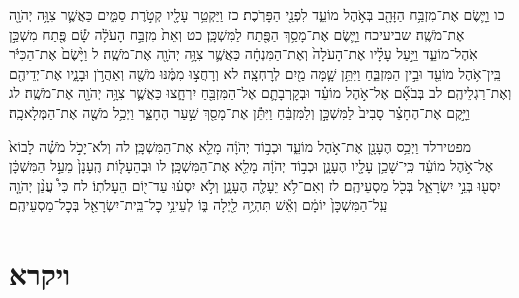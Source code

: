 \documentclass[twoside, openany, parskip=half, 11pt]{book}
\begin{document}
כו וַיָּ֛שֶׂם אֶת־מִזְבַּ֥ח הַזָּהָ֖ב בְּאֹ֣הֶל מוֹעֵ֑ד לִפְנֵ֖י הַפָּרֹֽכֶת׃ כז וַיַּקְטֵ֥ר עָלָ֖יו קְטֹ֣רֶת סַמִּ֑ים כַּאֲשֶׁ֛ר צִוָּ֥ה יְהֹוָ֖ה אֶת־מֹשֶֽׁה׃
שביעיכח וַיָּ֛שֶׂם אֶת־מָסַ֥ךְ הַפֶּ֖תַח לַמִּשְׁכָּֽן׃ כט וְאֵת֙ מִזְבַּ֣ח הָעֹלָ֔ה שָׂ֕ם פֶּ֖תַח מִשְׁכַּ֣ן אֹֽהֶל־מוֹעֵ֑ד וַיַּ֣עַל עָלָ֗יו אֶת־הָעֹלָה֙ וְאֶת־הַמִּנְחָ֔ה כַּאֲשֶׁ֛ר צִוָּ֥ה יְהֹוָ֖ה אֶת־מֹשֶֽׁה׃
ל וַיָּ֙שֶׂם֙ אֶת־הַכִּיֹּ֔ר בֵּֽין־אֹ֥הֶל מוֹעֵ֖ד וּבֵ֣ין הַמִּזְבֵּ֑חַ וַיִּתֵּ֥ן שָׁ֛מָּה מַ֖יִם לְרׇחְצָֽה׃ לא וְרָחֲצ֣וּ מִמֶּ֔נּוּ מֹשֶׁ֖ה וְאַהֲרֹ֣ן וּבָנָ֑יו אֶת־יְדֵיהֶ֖ם וְאֶת־רַגְלֵיהֶֽם׃ לב בְּבֹאָ֞ם אֶל־אֹ֣הֶל מוֹעֵ֗ד וּבְקׇרְבָתָ֛ם אֶל־הַמִּזְבֵּ֖חַ יִרְחָ֑צוּ כַּאֲשֶׁ֛ר צִוָּ֥ה יְהֹוָ֖ה אֶת־מֹשֶֽׁה׃
לג וַיָּ֣קֶם אֶת־הֶחָצֵ֗ר סָבִיב֙ לַמִּשְׁכָּ֣ן וְלַמִּזְבֵּ֔חַ וַיִּתֵּ֕ן אֶת־מָסַ֖ךְ שַׁ֣עַר הֶחָצֵ֑ר וַיְכַ֥ל מֹשֶׁ֖ה אֶת־הַמְּלָאכָֽה׃

מפטירלד וַיְכַ֥ס הֶעָנָ֖ן אֶת־אֹ֣הֶל מוֹעֵ֑ד וּכְב֣וֹד יְהֹוָ֔ה מָלֵ֖א אֶת־הַמִּשְׁכָּֽן׃ לה וְלֹא־יָכֹ֣ל מֹשֶׁ֗ה לָבוֹא֙ אֶל־אֹ֣הֶל מוֹעֵ֔ד כִּֽי־שָׁכַ֥ן עָלָ֖יו הֶעָנָ֑ן וּכְב֣וֹד יְהֹוָ֔ה מָלֵ֖א אֶת־הַמִּשְׁכָּֽן׃ לו וּבְהֵעָל֤וֹת הֶֽעָנָן֙ מֵעַ֣ל הַמִּשְׁכָּ֔ן יִסְע֖וּ בְּנֵ֣י יִשְׂרָאֵ֑ל בְּכֹ֖ל מַסְעֵיהֶֽם׃ לז וְאִם־לֹ֥א יֵעָלֶ֖ה הֶעָנָ֑ן וְלֹ֣א יִסְע֔וּ עַד־י֖וֹם הֵעָלֹתֽוֹ׃ לח כִּי֩ עֲנַ֨ן יְהֹוָ֤ה עַֽל־הַמִּשְׁכָּן֙ יוֹמָ֔ם וְאֵ֕שׁ תִּהְיֶ֥ה לַ֖יְלָה בּ֑וֹ לְעֵינֵ֥י כׇל־בֵּֽית־יִשְׂרָאֵ֖ל בְּכׇל־מַסְעֵיהֶֽם׃

	
\chapter[ויקרא]{ ויקרא }
\end{document}
